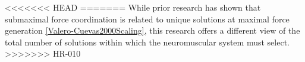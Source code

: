 
<<<<<<< HEAD
=======
While prior research has shown that submaximal force coordination is related to unique solutions at maximal force generation \ref{Valero-Cuevas2000Scaling}, this research offers a different view of the total number of solutions within which the neuromuscular system must select.
>>>>>>> HR-010




